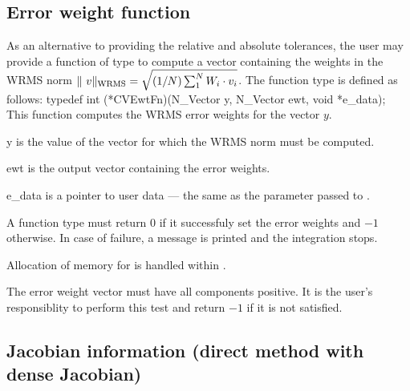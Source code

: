 \subsection{Error weight function}
\label{ss:ewtsetFn}
As an alternative to providing the relative and absolute tolerances, the user may
provide a function of type  to compute a vector  containing the
weights in the WRMS norm 
$\|\ v \|_{\mbox{\scriptsize WRMS}} = \sqrt{(1/N)\sum_1^N W_i \cdot v_i}$.
The function type  is defined as follows:
{
  typedef int (*CVEwtFn)(N\_Vector y, N\_Vector ewt, void *e\_data);
}
{
  This function computes the WRMS error weights for the vector $y$.
}
{
  \begin{args}[e\_data]
  \item[y]
    is the value of the vector for which the WRMS norm must be computed.
  \item[ewt]
    is the output vector containing the error weights.
  \item[e\_data]
    is a pointer to user data --- the same as the       
    parameter passed to .   
  \end{args}
}
{
  A  function type must return $0$ if it successfuly set
  the error weights and $-1$ otherwise. In case of failure, a message is printed
  and the integration stops.
}
{
  Allocation of memory for  is handled within {\cvodes}.

  {\warn} The error weight vector must have all components positive. It is the
  user's responsiblity to perform this test and return $-1$ if it is not 
  satisfied.
}

\subsection{Jacobian information (direct method with dense Jacobian)}
\label{ss:djacFn}

